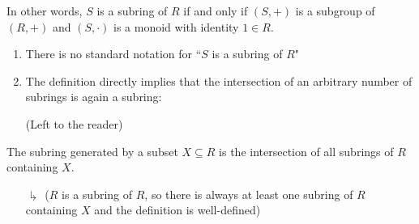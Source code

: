 \documentclass[12pt, a4paper, twoside, openright, titlepage]{book}
\begin{document}
\begin{rmk}{}{}
    In other words, $S$ is a subring of $R$ if and only if $(S,+)$ is a subgroup of $(R,+)$ and $(S,\cdot)$ is a monoid with identity $1 \in R$.
\end{rmk}

\begin{note*}{}{}
    \leavevmode
    \begin{enumerate}
        \item There is no standard notation for ``$S$ is a subring of $R$"
        \item The definition directly implies that the intersection of an arbitrary number of subrings is again a subring:
        \begin{proof*}{}{}
            (Left to the reader)
        \end{proof*}
    \end{enumerate}
\end{note*}

\begin{defn}{}{}
    The subring generated by a subset $X \subseteq R$ is the intersection of all subrings of $R$ containing $X$.
    \begin{enumerate}
        \item[$\drsh$] ($R$ is a subring of $R$, so there is always at least one subring of $R$ containing $X$ and the definition is well-defined)
    \end{enumerate}
\end{defn}
\end{document}
